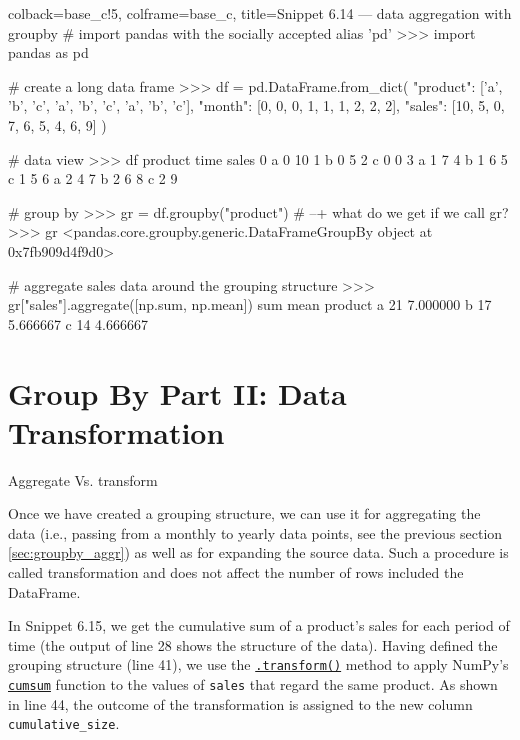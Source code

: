 \documentclass[a4paper,11pt]{book}
\numberwithin{figure}{chapter}
\numberwithin{table}{chapter}
\newcommand{\question}[1]{%
    \begin{tcolorbox}[colback=comp_c!10,colframe=comp_c,sidebyside align=top,width=\linewidth,before skip=1ex]
        #1
    \end{tcolorbox}
    \switchcolumn%
}
\newcommand{\note}[1]{%
    \begin{tcolorbox}[colback=white!0,colframe=white!10,width=\linewidth,before skip=1ex]
        #1
    \end{tcolorbox}
}
\begin{document}
\begin{pythoncode}[linenos=True]{colback=base_c!5, colframe=base_c, title=\sffamily Snippet 6.14 --- data aggregation with groupby}
# import pandas with the socially accepted alias 'pd'
>>> import pandas as pd

# create a long data frame
>>> df = pd.DataFrame.from_dict(
	{
	    "product": ['a', 'b', 'c', 'a', 'b', 'c', 'a', 'b', 'c'],	
	    "month": [0, 0, 0, 1, 1, 1, 2, 2, 2],
	    "sales": [10,  5,  0,  7,  6,  5,  4,  6,  9]
	}
    )

# data view
>>> df
  product  time  sales
0       a     0     10
1       b     0      5
2       c     0      0
3       a     1      7
4       b     1      6
5       c     1      5
6       a     2      4
7       b     2      6
8       c     2      9

# group by
>>> gr = df.groupby("product")
# --+ what do we get if we call gr?
>>> gr
<pandas.core.groupby.generic.DataFrameGroupBy object at 0x7fb909d4f9d0>

# aggregate sales data around the grouping structure
>>> gr["sales"].aggregate([np.sum, np.mean])
         sum      mean
product               
a         21  7.000000
b         17  5.666667
c         14  4.666667
\end{pythoncode}
\clearpage
\section{Group By Part II: Data Transformation}
\label{sec:groupby_transform}

\begin{paracol}{2}
	\question{\raggedright Aggregate Vs. transform}
	\note{Once we have created a grouping structure, we can use it for aggregating the data (i.e., passing from a monthly to yearly data points, see the previous section \ref{sec:groupby_aggr}) as well as for expanding the source data. Such a procedure is called transformation and does not affect the number of rows included the DataFrame.
	
	\quad In Snippet 6.15, we get the cumulative sum of a product's sales for each period of time (the output of line 28 shows the structure of the data). Having defined the grouping structure (line 41), we use the \href{https://pandas.pydata.org/docs/reference/api/pandas.DataFrame.transform.html?highlight=transform#pandas.DataFrame.transform}{\texttt{.transform()}} method to apply NumPy's \href{https://numpy.org/doc/stable/reference/generated/numpy.cumsum.html}{\texttt{cumsum}} function to the values of \texttt{sales} that regard the same product. As shown in line 44, the outcome of the transformation is assigned to the new column \texttt{cumulative\_size}.
	}
\end{paracol}
\end{document}
